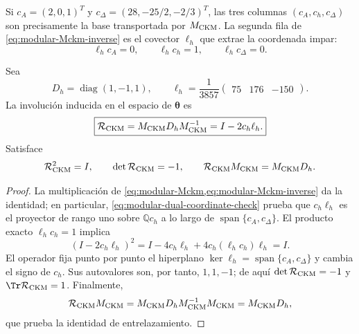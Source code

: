 Si \(c_A=(2,0,1)^T\) y
\(c_\Delta=(28,-25/2,-2/3)^T\), las tres columnas
\((c_A,c_h,c_\Delta)\) son precisamente la base transportada por
\(M_{\rm CKM}\). La segunda fila de
\cref{eq:modular-Mckm-inverse} es el covector \(\ell_h\) que extrae la
coordenada impar:
\begin{equation}
\label{eq:modular-dual-coordinate-check}
\ell_hc_A=0,
\qquad
\ell_hc_h=1,
\qquad
\ell_hc_\Delta=0.
\end{equation}

\begin{theorem}
\label{thm:modular-ckm-reflection}
Sea
\begin{equation}
\label{eq:modular-Dh-lh}
D_h=\operatorname{diag}(1,-1,1),
\qquad
\ell_h=\frac1{3857}\begin{pmatrix}75&176&-150\end{pmatrix}.
\end{equation}
La involuci\'on inducida en el espacio de \(\boldsymbol\theta\) es
\begin{equation}
\label{eq:modular-Rckm}
\boxed{
\mathcal R_{\rm CKM}
=M_{\rm CKM}D_hM_{\rm CKM}^{-1}
=I-2c_h\ell_h.}
\end{equation}
Satisface
\begin{equation}
\label{eq:modular-Rckm-properties}
\mathcal R_{\rm CKM}^2=I,
\qquad
\det\mathcal R_{\rm CKM}=-1,
\qquad
\mathcal R_{\rm CKM}M_{\rm CKM}=M_{\rm CKM}D_h.
\end{equation}
\end{theorem}

\begin{proof}
La multiplicaci\'on de
\cref{eq:modular-Mckm,eq:modular-Mckm-inverse} da la identidad; en
particular, \cref{eq:modular-dual-coordinate-check} prueba que
\(c_h\ell_h\) es el proyector de rango uno sobre \(\mathbb Qc_h\) a lo
largo de \(\operatorname{span}\{c_A,c_\Delta\}\). El producto exacto
\(\ell_hc_h=1\) implica
\[
(I-2c_h\ell_h)^2
=I-4c_h\ell_h+4c_h(\ell_hc_h)\ell_h=I.
\]
El operador fija punto por punto el hiperplano
\(\ker\ell_h=\operatorname{span}\{c_A,c_\Delta\}\) y cambia el signo de
\(c_h\). Sus autovalores son, por tanto, \(1,1,-1\); de aqu\'i
\(\det\mathcal R_{\rm CKM}=-1\) y
\(\Tr\mathcal R_{\rm CKM}=1\). Finalmente,
\[
\mathcal R_{\rm CKM}M_{\rm CKM}
=M_{\rm CKM}D_hM_{\rm CKM}^{-1}M_{\rm CKM}
=M_{\rm CKM}D_h,
\]
que prueba la identidad de entrelazamiento.
\end{proof}


